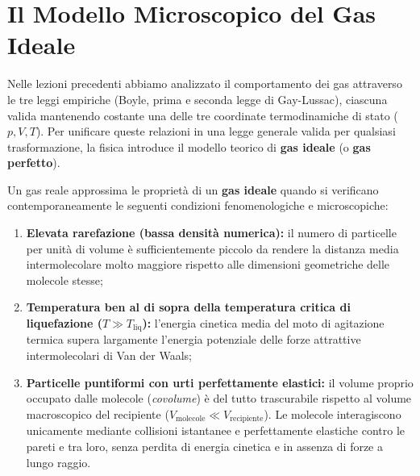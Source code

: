 \documentclass[11pt,a4paper,oneside]{report}
\begin{document}
\section{Il Modello Microscopico del Gas Ideale}

Nelle lezioni precedenti abbiamo analizzato il comportamento dei gas attraverso le tre leggi empiriche (Boyle, prima e seconda legge di Gay-Lussac), ciascuna valida mantenendo costante una delle tre coordinate termodinamiche di stato ($p, V, T$). Per unificare queste relazioni in una legge generale valida per qualsiasi trasformazione, la fisica introduce il modello teorico di \textbf{gas ideale} (o \textbf{gas perfetto}).

\begin{definizione}
Un gas reale approssima le propriet\`a di un \textbf{gas ideale} quando si verificano contemporaneamente le seguenti condizioni fenomenologiche e microscopiche:
\begin{enumerate}
  \item \textbf{Elevata rarefazione (bassa densit\`a numerica):} il numero di particelle per unit\`a di volume \`e sufficientemente piccolo da rendere la distanza media intermolecolare molto maggiore rispetto alle dimensioni geometriche delle molecole stesse;
  \item \textbf{Temperatura ben al di sopra della temperatura critica di liquefazione ($T \gg T_{\text{liq}}$):} l'energia cinetica media del moto di agitazione termica supera largamente l'energia potenziale delle forze attrattive intermolecolari di Van der Waals;
  \item \textbf{Particelle puntiformi con urti perfettamente elastici:} il volume proprio occupato dalle molecole (\textit{covolume}) \`e del tutto trascurabile rispetto al volume macroscopico del recipiente ($V_{\text{molecole}} \ll V_{\text{recipiente}}$). Le molecole interagiscono unicamente mediante collisioni istantanee e perfettamente elastiche contro le pareti e tra loro, senza perdita di energia cinetica e in assenza di forze a lungo raggio.
\end{enumerate}
\end{definizione}
\end{document}
